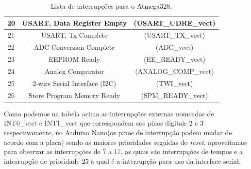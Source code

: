 \documentclass[a4paper,12pt,portuguese]{ufms-cpcx}
\begin{document}
\begin{table}[!h]
\begin{tabular}{|c|cc|}
		20 &           USART, Data Register Empty            &  (USART\_UDRE\_vect)  \\ \hline
		21 &               USART, Tx Complete                &   (USART\_TX\_vect)   \\ \hline
		22 &             ADC Conversion Complete             &     (ADC\_vect)      \\ \hline
		23 &                  EEPROM Ready                   &   (EE\_READY\_vect)   \\ \hline
		24 &                Analog Comparator                & (ANALOG\_COMP\_vect)  \\ \hline
		25 &         2-wire Serial Interface  (I2C)          &     (TWI\_vect)      \\ \hline
		26 &           Store Program Memory Ready            &  (SPM\_READY\_vect)   \\ \hline
	\end{tabular}
	\caption[Lista de interrupções]{Lista de interrupções para o Atmega328.}
	\label{Tab:interrupcoes}
\end{table}

Como podemos na tabela acima as interrupções externas nomeadas de INT0\_vect e INT1\_vect que correspondem aos pinos digitais 2 e 3 respectivamente, no Arduino Nano(os pinos de interrupção podem mudar de acordo com a placa) sendo as maiores prioridades seguidas do \textit{reset}, aproveitamos para observar as interrupções de 7 a 17, as quais são interrupções de tempos e a interrupção de prioridade 25 a qual é a interrupção para uso da interface serial.
\end{document}
